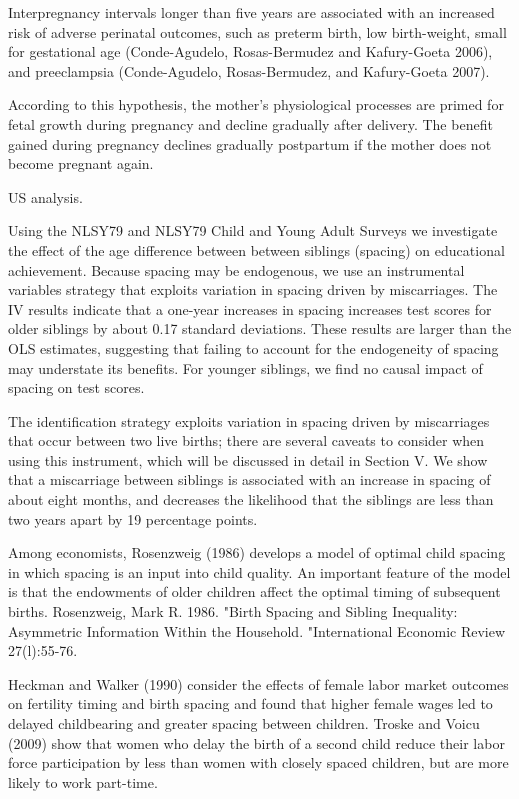 Interpregnancy intervals longer than five years are associated with an
increased risk of adverse perinatal outcomes, such as preterm birth, low
birth-weight, small for gestational age (Conde-Agudelo, Rosas-Bermudez
and Kafury-Goeta 2006), and preeclampsia (Conde-Agudelo, Rosas-Bermudez,
and Kafury-Goeta 2007).

According to this hypothesis, the mother’s physiological processes are
primed for fetal growth during pregnancy and decline gradually after
delivery. The benefit gained during pregnancy declines gradually
postpartum if the mother does not become pregnant again.

\citet{Buckles2012}

US analysis.

Using the NLSY79 and NLSY79 Child and Young Adult Surveys we investigate 
the effect of the age difference between between siblings (spacing) on
educational achievement. Because spacing may be endogenous, we use an
instrumental variables strategy that exploits variation in spacing driven
by miscarriages. The IV results indicate that a one-year increases in
spacing increases test scores for older siblings by about 0.17 standard
deviations. These results are larger than the OLS estimates, suggesting
that failing to account for the endogeneity of spacing may understate
its benefits. For younger siblings, we find no causal impact of spacing
on test scores.

The identification strategy exploits variation in spacing driven by 
miscarriages that occur between two live births; there are several caveats to 
consider when using this instrument, which will be discussed in detail in Section V. 
We show that a miscarriage between siblings is associated with an increase in 
spacing of about eight months, and decreases the likelihood that the siblings 
are less than two years apart by 19 percentage points.

Among economists, Rosenzweig (1986) develops a model of optimal child spacing
in which spacing is an input into child quality. An important feature of the model
is that the endowments of older children affect the optimal timing of subsequent
births.
Rosenzweig, Mark R. 1986. "Birth Spacing and Sibling Inequality: Asymmetric Information
Within the Household. "International Economic Review 27(l):55-76. 

Heckman and Walker (1990) consider the effects of female labor market outcomes
on fertility timing and birth spacing and found that higher female wages led to
delayed childbearing and greater spacing between children. Troske and Voicu (2009)
show that women who delay the birth of a second child reduce their labor force
participation by less than women with closely spaced children, but are more likely
to work part-time.

